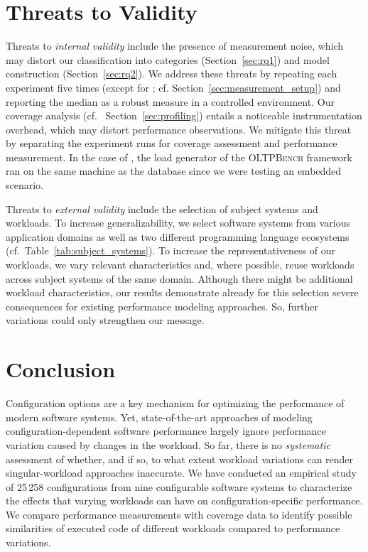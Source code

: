 {{{\section{Threats to Validity}\label{sec:threats}
Threats to \textit{internal validity} include the presence of  measurement noise, 
which may distort our classification into categories (Section~\ref{sec:rq1}) and model construction (Section~\ref{sec:rq2}). We address these threats by repeating each experiment five times  (except for \htwo; cf. Section~\ref{sec:measurement_setup}) and reporting the median as a robust measure in a controlled environment. Our coverage analysis (cf.~ Section~\ref{sec:profiling}) entails a noticeable instrumentation overhead, which may distort performance observations. We mitigate this threat by separating the experiment runs for coverage assessment and performance measurement. In the case of \htwo, the load generator of the \textsc{OLTPBench} framework~\cite{difallah_oltp_2013} ran on the same machine as the database since we were testing an embedded scenario. 	
	
Threats to\textit{ external validity} include the selection of subject systems and workloads. To increase generalizability, we select software systems from various application domains as well as two different programming language ecosystems (cf.~Table~\ref{tab:subject_systems}). To increase the representativeness of our workloads, we vary relevant characteristics %
and, where possible, reuse workloads across subject systems of the same domain. Although there might be additional workload characteristics, our results demonstrate already for this selection severe consequences for existing performance modeling approaches. So, further variations could only strengthen our message.

	

\section{Conclusion}\label{sec:conclusion}\color{black}
Configuration options are a key mechanism for optimizing the performance of modern software systems.
Yet, state-of-the-art approaches of modeling configuration-dependent software performance  largely ignore performance variation caused by changes in the workload. So far, there is no \textit{systematic} assessment of whether, and if so, to what extent workload variations can render singular-workload approaches inaccurate. We have conducted an empirical study of 25\,258 configurations from nine configurable software systems to characterize the effects that varying workloads can have on configuration-specific performance. We compare performance measurements with coverage data to identify possible similarities of executed code of different workloads compared to performance variations. 

}}}
